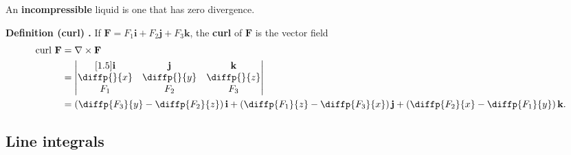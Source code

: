 An \textbf{incompressible} liquid is one that has zero divergence.

\begin{shaded}
\textbf{Definition (curl) \cite{math2111_notes}.} If $\mathbf{F} = F_1 \mathbf{i} + F_2 \mathbf{j} + F_3 \mathbf{k}$, the \textbf{curl} of $\mathbf{F}$ is the vector field
\begin{align*}
\text{curl} \ \mathbf{F} &= \nabla \times \mathbf{F} \\
&= \begin{vmatrix}[1.5]
	\mathbf{i} & \mathbf{j} & \mathbf{k} \\
	\diffp{}{x} & \diffp{}{y} & \diffp{}{z} \\
	F_1 & F_2 & F_3
\end{vmatrix} \\
&= \left( \diffp{F_3}{y} - \diffp{F_2}{z} \right) \mathbf{i} + \left( \diffp{F_1}{z} - \diffp{F_3}{x} \right) \mathbf{j} + \left( \diffp{F_2}{x} - \diffp{F_1}{y} \right) \mathbf{k} .
\end{align*}
\end{shaded}

\subsection{Line integrals}

